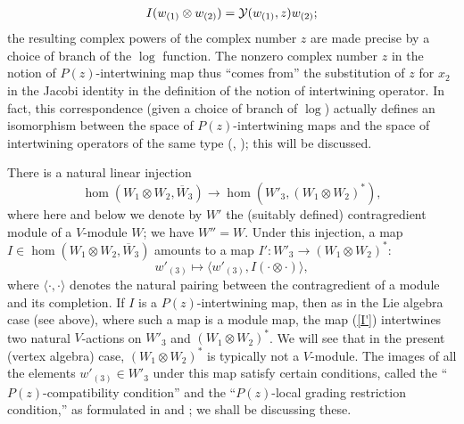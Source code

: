 \documentclass[12pt]{article}
\begin{document}
\begin{rema}
{\begin{eqnarray}
I(w_{(1)} \otimes w_{(2)}) = {\cal Y}(w_{(1)},z)w_{(2)};
\end{eqnarray}
the resulting complex powers of the complex number $z$ are made
precise by a choice of branch of the $\log$ function.  The nonzero
complex number $z$ in the notion of $P(z)$-intertwining map thus
``comes {}from'' the substitution of $z$ for $x_2$ in the Jacobi
identity in the definition of the notion of intertwining operator.  In
fact, this correspondence (given a choice of branch of $\log$)
actually defines an isomorphism between the space of
$P(z)$-intertwining maps and the space of intertwining operators of
the same type (\cite{tensor1}, \cite{tensor3}); this will be
discussed.}
\end{rema}

There is a natural linear injection
\begin{equation}\label{homva}
\hom (W_1\otimes W_2, \overline{W}_3)\longrightarrow
\hom (W'_3, (W_1\otimes W_2)^*),
\end{equation}
where here and below we denote by $W'$ the (suitably defined)
contragredient module of a $V$-module $W$; we have $W''=W$.  Under
this injection, a map $I\in \hom (W_1\otimes W_2, \overline{W}_3)$
amounts to a map $I':
W'_3\longrightarrow (W_1\otimes W_2)^*$:
\begin{equation}\label{I'}
w'_{(3)} \mapsto \langle w'_{(3)}, I(\cdot\otimes \cdot)\rangle,
\end{equation}
where $\langle \cdot,\cdot \rangle$ denotes the natural pairing
between the contragredient of a module and its completion. If $I$ is a
$P(z)$-intertwining map, then as in the Lie algebra case (see above),
where such a map is a module map, the map (\ref{I'}) intertwines two
natural $V$-actions on $W'_3$ and $(W_1\otimes W_2)^*$. We will see
that in the present (vertex algebra) case, $(W_1\otimes W_2)^*$ is
typically not a $V$-module.  The images of all the elements $w'_{(3)}\in
W'_3$ under this map satisfy certain conditions, called the
``$P(z)$-compatibility condition'' and the ``$P(z)$-local grading
restriction condition,'' as formulated in \cite{tensor1} and
\cite{tensor3}; we shall be discussing these.
\end{document}
